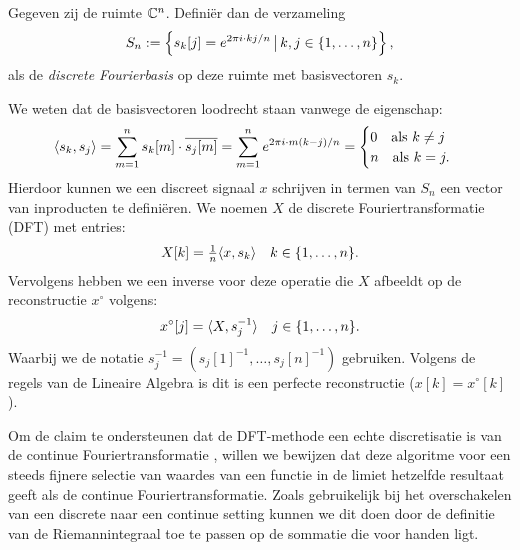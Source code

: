 \begin{definitie} Gegeven zij de ruimte $\mathbb{C}^n$. Defini\"er dan de verzameling
\[
  S_n := \left\{ s_k [j] = e^{{2\pi i}\cdot k j/n } \,\big|\, k,j \in \{1, \ldots, n\} \right\},
\]
als de \emph{discrete Fourierbasis} op deze ruimte met basisvectoren $s_k$.
\end{definitie}
We weten dat de basisvectoren loodrecht staan vanwege de eigenschap:
\[
  \langle s_k , s_j \rangle = 
  \sum_{m=1}^n s_k[m]\cdot \overline{s_j[m]} = 
  \sum_{m=1}^n e^{{2\pi i}\cdot m (k-j)/n} =
  \begin{cases}
    0 \quad \text{als } k\neq j\\
    n \quad \text{als } k = j.
  \end{cases}
\]
Hierdoor kunnen we een discreet signaal $x$ schrijven in termen van $S_n$ 
een vector van inproducten te defini\"eren.
We noemen $X$ de discrete Fouriertransformatie (DFT) met entries:
\[
  X[k] = \tfrac{1}{n} \langle x , s_k \rangle \quad k\in\{1, \ldots ,n\}.
\]
Vervolgens hebben we een inverse voor deze operatie die $X$ afbeeldt op de reconstructie $x^\circ$ volgens:
\[
  x^\circ[j] = \langle X , s_j^{-1} \rangle \quad j\in \{1, \ldots, n\}.
\]
Waarbij we de notatie $s_j^{-1} = (s_j[1]^{-1},\ldots, s_j[n]^{-1})$ gebruiken.
Volgens de regels van de Lineaire Algebra is dit is een perfecte reconstructie ($x[k] = x^\circ[k]$).

Om de claim te ondersteunen dat de DFT-methode een echte discretisatie is van de continue Fouriertransformatie ,
willen we bewijzen dat deze algoritme voor een steeds fijnere selectie van waardes van een functie in de 
limiet hetzelfde resultaat geeft als de continue Fouriertransformatie. 
Zoals gebruikelijk bij het overschakelen van een discrete naar een continue setting kunnen we dit doen 
door de definitie van de Riemannintegraal toe te passen op de sommatie die voor handen ligt.

